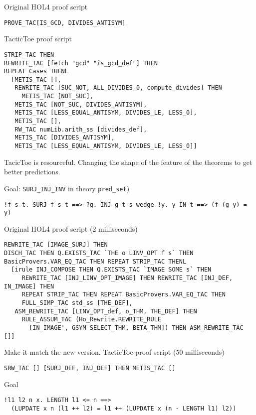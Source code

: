 \documentclass[runningheads,a4paper,draft]{svjour3}
\def\holfour{\textsf{HOL4}\xspace}
\def\tactictoe{\textsf{TacticToe}\xspace}
\begin{document}
Original \holfour proof script
\begin{lstlisting}[language=SMLSmall]
PROVE_TAC[IS_GCD, DIVIDES_ANTISYM]
\end{lstlisting}

\vspace{5mm}

\tactictoe proof script
\begin{lstlisting}[language=SMLSmall]
STRIP_TAC THEN
REWRITE_TAC [fetch "gcd" "is_gcd_def"] THEN
REPEAT Cases THENL
  [METIS_TAC [],
   REWRITE_TAC [SUC_NOT, ALL_DIVIDES_0, compute_divides] THEN
     METIS_TAC [NOT_SUC],
   METIS_TAC [NOT_SUC, DIVIDES_ANTISYM],
   METIS_TAC [LESS_EQUAL_ANTISYM, DIVIDES_LE, LESS_0],
   METIS_TAC [],
   RW_TAC numLib.arith_ss [divides_def],
   METIS_TAC [DIVIDES_ANTISYM],
   METIS_TAC [LESS_EQUAL_ANTISYM, DIVIDES_LE, LESS_0]]
\end{lstlisting}

TacicToe is resourceful. Changing the shape of the feature of the theorems
to get better predictions.

Goal: \texttt{SURJ\_INJ\_INV} in theory \texttt{pred\_set})
\begin{lstlisting}[language=SMLSmall]
!f s t. SURJ f s t ==> ?g. INJ g t s wedge !y. y IN t ==> (f (g y) = y)
\end{lstlisting}

Original \holfour proof script (2 milliseconds)
\begin{lstlisting}[language=SMLSmall]
REWRITE_TAC [IMAGE_SURJ] THEN
DISCH_TAC THEN Q.EXISTS_TAC `THE o LINV_OPT f s` THEN
BasicProvers.VAR_EQ_TAC THEN REPEAT STRIP_TAC THENL
  [irule INJ_COMPOSE THEN Q.EXISTS_TAC `IMAGE SOME s` THEN
     REWRITE_TAC [INJ_LINV_OPT_IMAGE] THEN REWRITE_TAC [INJ_DEF, IN_IMAGE] THEN
     REPEAT STRIP_TAC THEN REPEAT BasicProvers.VAR_EQ_TAC THEN
     FULL_SIMP_TAC std_ss [THE_DEF],
   ASM_REWRITE_TAC [LINV_OPT_def, o_THM, THE_DEF] THEN
     RULE_ASSUM_TAC (Ho_Rewrite.REWRITE_RULE
       [IN_IMAGE', GSYM SELECT_THM, BETA_THM]) THEN ASM_REWRITE_TAC []]
\end{lstlisting}

\vspace{5mm}

Make it match the new version.
\tactictoe proof script (50 milliseconds)
\begin{lstlisting}[language=SMLSmall]
SRW_TAC [] [SURJ_DEF, INJ_DEF] THEN METIS_TAC []
\end{lstlisting}


Goal
\begin{lstlisting}[language=SMLSmall]
!l1 l2 n x. LENGTH l1 <= n ==>
  (LUPDATE x n (l1 ++ l2) = l1 ++ (LUPDATE x (n - LENGTH l1) l2))
\end{lstlisting}
\end{document}
